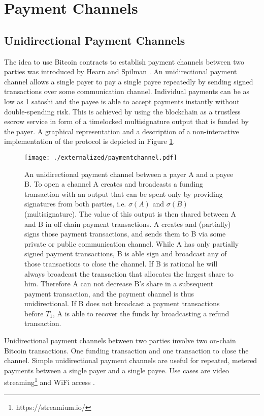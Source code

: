 \section{Payment Channels}

\subsection{Unidirectional Payment Channels}
\label{sec:unipc}

The idea to use Bitcoin contracts to establish payment channels between two parties was introduced by Hearn and Spilman \cite{Hearn}. An unidirectional payment channel allows a single payer to pay a single payee repeatedly by sending signed transactions over some communication channel. Individual payments can be as low as 1 satoshi and the payee is able to accept payments instantly without double-spending risk. This is achieved by using the blockchain as a trustless escrow service in form of a timelocked multisignature output that is funded by the payer. A graphical representation and a description of a non-interactive implementation of the protocol is depicted in Figure \ref{fig:paymentchannels}.

\begin{figure}
\texttt{[image: ./externalized/paymentchannel.pdf]}
\caption{An unidirectional payment channel between a payer A and a payee B. To open a channel A creates and broadcasts a funding transaction with an output that can be spent only by providing signatures from both parties, i.e. $\sigma(A)$ and $\sigma(B)$ (multisignature). The value of this output is then shared between A and B in off-chain payment transactions. A creates and (partially) signs those payment transactions, and sends them to B via some private or public communication channel. While A has only partially signed payment transactions, B is able sign and broadcast any of those transactions to close the channel. If B is rational he will always broadcast the transaction that allocates the largest share to him. Therefore A can not decrease B's share in a subsequent payment transaction, and the payment channel is thus unidirectional. If B does not broadcast a payment transactions before $T_1$, A is able to recover the funds by broadcasting a refund transaction.}
\label{fig:paymentchannels}
\end{figure}

Unidirectional payment channels between two parties involve two on-chain Bitcoin transactions. One funding transaction and one transaction to close the channel. Simple unidirectional payment channels are useful for repeated, metered payments between a single payer and a single payee. Use cases are video streaming\footnote{https://streamium.io/} and WiFi access \cite{Siby2013}. 

